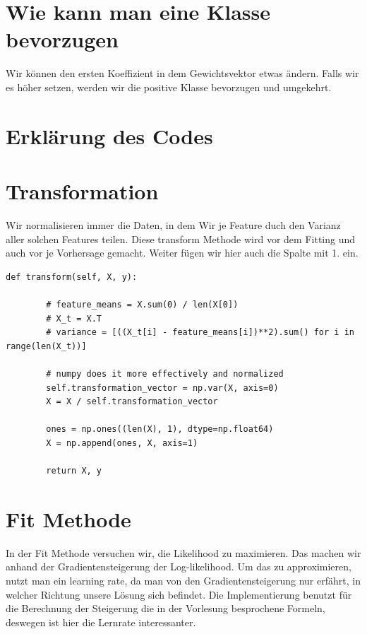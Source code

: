 \section*{Wie kann man eine Klasse bevorzugen}

Wir können den ersten Koeffizient in dem Gewichtsvektor etwas ändern. Falls wir es höher setzen, werden wir
die positive Klasse bevorzugen und umgekehrt.

\section*{Erklärung des Codes}

\section*{Transformation}

Wir normalisieren immer die Daten, in dem Wir je Feature duch den Varianz aller solchen Features teilen.
Diese transform Methode wird vor dem Fitting und auch vor je Vorhersage gemacht. Weiter fügen wir hier auch
die Spalte mit 1. ein.

\begin{lstlisting}[style=py]
    def transform(self, X, y):

        # feature_means = X.sum(0) / len(X[0])
        # X_t = X.T
        # variance = [((X_t[i] - feature_means[i])**2).sum() for i in range(len(X_t))]

        # numpy does it more effectively and normalized
        self.transformation_vector = np.var(X, axis=0)
        X = X / self.transformation_vector

        ones = np.ones((len(X), 1), dtype=np.float64)
        X = np.append(ones, X, axis=1)

        return X, y
\end{lstlisting}

\section*{Fit Methode}

In der Fit Methode versuchen wir, die Likelihood zu maximieren. Das machen wir anhand der Gradientensteigerung
der Log-likelihood. Um das zu approximieren, nutzt man ein learning rate, da man von den Gradientensteigerung nur
erfährt, in welcher Richtung unsere Lösung sich befindet. Die Implementierung benutzt für die Berechnung der
Steigerung die in der Vorlesung besprochene Formeln, deswegen ist hier die Lernrate interessanter.

